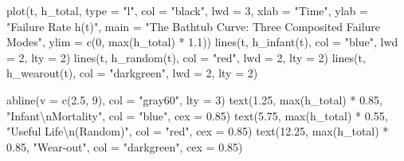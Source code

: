 \documentclass[
  letterpaper,
  DIV=11,
  numbers=noendperiod]{scrreprt}
\newenvironment{Shaded}{\begin{snugshade}}{\end{snugshade}}
\newcommand{\AttributeTok}[1]{\textcolor[rgb]{0.40,0.45,0.13}{#1}}
\newcommand{\DecValTok}[1]{\textcolor[rgb]{0.68,0.00,0.00}{#1}}
\newcommand{\FloatTok}[1]{\textcolor[rgb]{0.68,0.00,0.00}{#1}}
\newcommand{\FunctionTok}[1]{\textcolor[rgb]{0.28,0.35,0.67}{#1}}
\newcommand{\NormalTok}[1]{\textcolor[rgb]{0.00,0.23,0.31}{#1}}
\newcommand{\SpecialCharTok}[1]{\textcolor[rgb]{0.37,0.37,0.37}{#1}}
\newcommand{\StringTok}[1]{\textcolor[rgb]{0.13,0.47,0.30}{#1}}
\begin{document}
\begin{Shaded}
\begin{Highlighting}[]
\FunctionTok{plot}\NormalTok{(t, h\_total, }\AttributeTok{type =} \StringTok{"l"}\NormalTok{, }\AttributeTok{col =} \StringTok{"black"}\NormalTok{, }\AttributeTok{lwd =} \DecValTok{3}\NormalTok{,}
     \AttributeTok{xlab =} \StringTok{"Time"}\NormalTok{, }\AttributeTok{ylab =} \StringTok{"Failure Rate h(t)"}\NormalTok{,}
     \AttributeTok{main =} \StringTok{"The Bathtub Curve: Three Composited Failure Modes"}\NormalTok{,}
     \AttributeTok{ylim =} \FunctionTok{c}\NormalTok{(}\DecValTok{0}\NormalTok{, }\FunctionTok{max}\NormalTok{(h\_total) }\SpecialCharTok{*} \FloatTok{1.1}\NormalTok{))}
\FunctionTok{lines}\NormalTok{(t, }\FunctionTok{h\_infant}\NormalTok{(t),  }\AttributeTok{col =} \StringTok{"blue"}\NormalTok{,      }\AttributeTok{lwd =} \DecValTok{2}\NormalTok{, }\AttributeTok{lty =} \DecValTok{2}\NormalTok{)}
\FunctionTok{lines}\NormalTok{(t, }\FunctionTok{h\_random}\NormalTok{(t),  }\AttributeTok{col =} \StringTok{"red"}\NormalTok{,       }\AttributeTok{lwd =} \DecValTok{2}\NormalTok{, }\AttributeTok{lty =} \DecValTok{2}\NormalTok{)}
\FunctionTok{lines}\NormalTok{(t, }\FunctionTok{h\_wearout}\NormalTok{(t), }\AttributeTok{col =} \StringTok{"darkgreen"}\NormalTok{, }\AttributeTok{lwd =} \DecValTok{2}\NormalTok{, }\AttributeTok{lty =} \DecValTok{2}\NormalTok{)}

\FunctionTok{abline}\NormalTok{(}\AttributeTok{v =} \FunctionTok{c}\NormalTok{(}\FloatTok{2.5}\NormalTok{, }\DecValTok{9}\NormalTok{), }\AttributeTok{col =} \StringTok{"gray60"}\NormalTok{, }\AttributeTok{lty =} \DecValTok{3}\NormalTok{)}
\FunctionTok{text}\NormalTok{(}\FloatTok{1.25}\NormalTok{,  }\FunctionTok{max}\NormalTok{(h\_total) }\SpecialCharTok{*} \FloatTok{0.85}\NormalTok{, }\StringTok{"Infant}\SpecialCharTok{\textbackslash{}n}\StringTok{Mortality"}\NormalTok{,    }\AttributeTok{col =} \StringTok{"blue"}\NormalTok{,      }\AttributeTok{cex =} \FloatTok{0.85}\NormalTok{)}
\FunctionTok{text}\NormalTok{(}\FloatTok{5.75}\NormalTok{,  }\FunctionTok{max}\NormalTok{(h\_total) }\SpecialCharTok{*} \FloatTok{0.55}\NormalTok{, }\StringTok{"Useful Life}\SpecialCharTok{\textbackslash{}n}\StringTok{(Random)"}\NormalTok{, }\AttributeTok{col =} \StringTok{"red"}\NormalTok{,       }\AttributeTok{cex =} \FloatTok{0.85}\NormalTok{)}
\FunctionTok{text}\NormalTok{(}\FloatTok{12.25}\NormalTok{, }\FunctionTok{max}\NormalTok{(h\_total) }\SpecialCharTok{*} \FloatTok{0.85}\NormalTok{, }\StringTok{"Wear{-}out"}\NormalTok{,              }\AttributeTok{col =} \StringTok{"darkgreen"}\NormalTok{, }\AttributeTok{cex =} \FloatTok{0.85}\NormalTok{)}


\end{Highlighting}
\end{Shaded}
\end{document}
